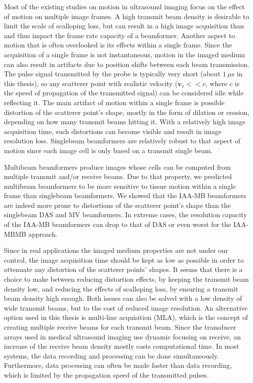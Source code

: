 Most of the existing studies on motion in ultrasound imaging focus on the effect of motion on multiple image frames.
A high transmit beam density is desirable to limit the scale of scalloping loss, but can result in a high image acquisition than and thus impact the frame rate capacity of a beamformer.
Another aspect to motion that is often overlooked is its effects within a single frame.
Since the acquisition of a single frame is not instantaneous, motion in the imaged medium can also result in artifacts due to position shifts between each beam transmission.
The pulse signal transmitted by the probe is typically very short (about $1~\mu$s in this thesis), so any scatterer point with realistic velocity ($\boldsymbol{v}_s << c$, where $c$ is the speed of propagation of the transmitted signal) can be considered idle while reflecting it.
The main artifact of motion within a single frame is possible distortion of the scatterer point's shape, mostly in the form of dilation or erosion, depending on how many transmit beams hitting it.
With a relatively high image acquisition time, such distortions can become visible and result in image resolution loss.
Singlebeam beamformers are relatively robust to that aspect of motion since each image cell is only based on a transmit single beam.

Multibeam beamformers produce images whose cells can be computed from multiple transmit and/or receive beams. Due to that property, we predicted multibeam beamformers to be more sensitive to tissue motion within a single frame than singlebeam beamformers.
We showed that the IAA-MB beamformers are indeed more prone to distortions of the scatterer point's shape than the singlebeam DAS and MV beamformers.
In extreme cases, the resolution capacity of the IAA-MB beamformers can drop to that of DAS or even worst for the IAA-MBMB approach.

Since in real applications the imaged medium properties are not under our control, the image acquisition time should be kept as low as possible in order to attenuate any distortion of the scatterer points' shapes.
It seems that there is a choice to make between reducing distortion effects, by keeping the transmit beam density low, and reducing the effects of scalloping loss, by ensuring a transmit beam density high enough. Both issues can also be solved with a low density of wide transmit beams, but to the cost of reduced image resolution.
An alternative option used in this thesis is multi-line acquisition (MLA), which is the concept of creating multiple receive beams for each transmit beam.
Since the transducer arrays used in medical ultrasound imaging use dynamic focusing on receive, an increase of the receive beam density mostly costs computational time.
In most systems, the data recording and processing can be done simultaneously. Furthermore, data processing can often be made faster than data recording, which is limited by the propagation speed of the transmitted pulses.

